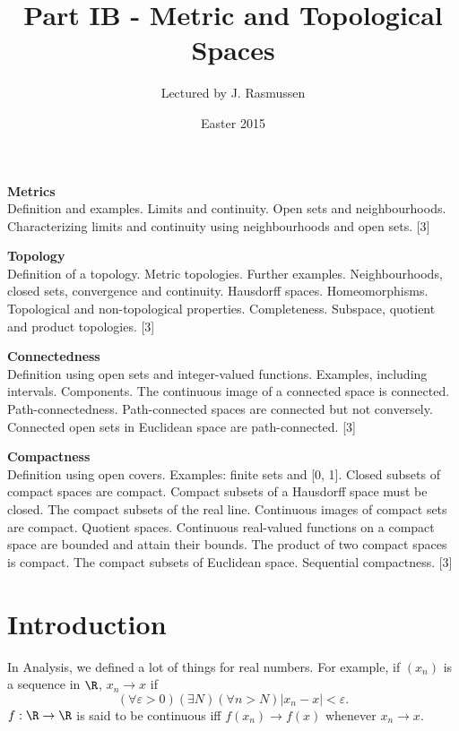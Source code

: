 \documentclass[a4paper]{article}
\title{Part IB - Metric and Topological Spaces}
\author{Lectured by J. Rasmussen}
\date{Easter 2015}
\begin{document}
\maketitle
{\small
\noindent\textbf{Metrics}\\
Definition and examples. Limits and continuity. Open sets and neighbourhoods. Characterizing limits and continuity using neighbourhoods and open sets.\hspace*{\fill} [3]

\vspace{10pt}
\noindent\textbf{Topology}\\
Definition of a topology. Metric topologies. Further examples. Neighbourhoods, closed sets, convergence and continuity. Hausdorff spaces. Homeomorphisms. Topological and non-topological properties. Completeness. Subspace, quotient and product topologies.\hspace*{\fill} [3]

\vspace{10pt}
\noindent\textbf{Connectedness}\\
Definition using open sets and integer-valued functions. Examples, including intervals. Components. The continuous image of a connected space is connected. Path-connectedness. Path-connected spaces are connected but not conversely. Connected open sets in Euclidean space are path-connected.\hspace*{\fill} [3]

\vspace{10pt}
\noindent\textbf{Compactness}\\
Definition using open covers. Examples: finite sets and [0, 1]. Closed subsets of compact spaces are compact. Compact subsets of a Hausdorff space must be closed. The compact subsets of the real line. Continuous images of compact sets are compact. Quotient spaces. Continuous real-valued functions on a compact space are bounded and attain their bounds. The product of two compact spaces is compact. The compact subsets of Euclidean space. Sequential compactness.\hspace*{\fill} [3]}

\tableofcontents
\setcounter{section}{-1}
\section{Introduction}
In Analysis, we defined a lot of things for real numbers. For example, if $(x_n)$ is a sequence in $\R$, $x_n \to x$ if
\[
  (\forall \varepsilon > 0)(\exists N)(\forall n > N) |x_n - x| < \varepsilon.
\]
$f: \R \to \R$ is said to be continuous iff $f(x_n) \to f(x)$ whenever $x_n \to x$.
\end{document}
